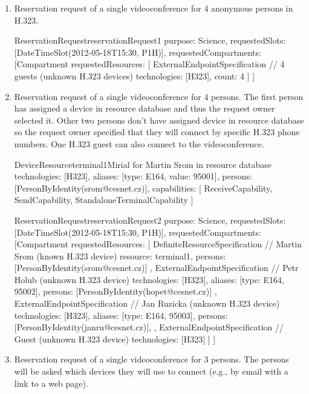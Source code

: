 \begin{enumerate}
\item Reservation request of a single videoconference for 4 anonymous persons in H.323.

\begin{EntityExample}{ReservationRequest}{reservationRequest1}{}
purpose: Science,
requestedSlots: [DateTimeSlot(2012-05-18T15:30, P1H)],
requestedCompartments: [Compartment {
  requestedResources: [
    ExternalEndpointSpecification { // 4 guests (unknown H.323 devices)
      technologies: [H323],
      count: 4
    }  
  ]
}]
\end{EntityExample}

\item Reservation request of a single videoconference for 4 persons. The first person  has assigned a device in resource database and thus the request owner selected it. Other two persons don't have assigned device in resource database so the request owner specified that they will connect by specific H.323 phone numbers. One H.323 guest can also connect to the videoconference.

\begin{EntityExample}{DeviceResource}{terminal1}{Mirial for Martin Srom in resource database}
technologies: [H323], 
aliases: [{type: E164, value: 95001}],
persons: [PersonByIdentity(srom@cesnet.cz)],
capabilities: [
  ReceiveCapability, SendCapability, StandaloneTerminalCapability
]
\end{EntityExample}

\begin{EntityExample}{ReservationRequest}{reservationRequest2}{}
purpose: Science,
requestedSlots: [DateTimeSlot(2012-05-18T15:30, P1H)],
requestedCompartments: [Compartment {
  requestedResources: [
    DefiniteResourceSpecification { // Martin Srom (known H.323 device)
      resource: terminal1,
      persons: [PersonByIdentity(srom@cesnet.cz)] 
    },
    ExternalEndpointSpecification { // Petr Holub (unknown H.323 device)
      technologies: [H323],
      aliases: [{type: E164, 95002}],
      persons: [PersonByIdentity(hopet@cesnet.cz)]
    },
    ExternalEndpointSpecification { // Jan Ruzicka (unknown H.323 device)
      technologies: [H323],
      aliases: [{type: E164, 95003}],
      persons: [PersonByIdentity(janru@cesnet.cz)], 
    },
    ExternalEndpointSpecification { // Guest (unknown H.323 device)
      technologies: [H323]
    }
  ]
}]
\end{EntityExample}

\item Reservation request of a single videoconference for 3 persons. The persons will be asked which devices they will use to connect (e.g., by email with a link to a web page).


\end{enumerate}
